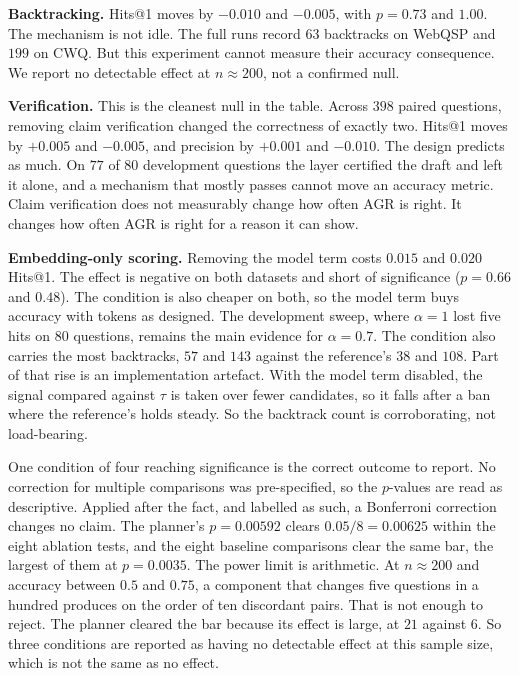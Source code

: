 \textbf{Backtracking.} Hits@1 moves by $-0.010$ and $-0.005$, with $p = 0.73$
and $1.00$. The mechanism is not idle. The full runs record $63$ backtracks on
WebQSP and $199$ on CWQ. But this experiment cannot measure their accuracy
consequence. We report no detectable effect at $n \approx 200$, not a confirmed
null.

\textbf{Verification.} This is the cleanest null in the table. Across $398$
paired questions, removing claim verification changed the correctness of exactly
two. Hits@1 moves by $+0.005$ and $-0.005$, and precision by $+0.001$ and
$-0.010$. The design predicts as much. On $77$ of $80$ development questions the
layer certified the draft and left it alone, and a mechanism that mostly passes
cannot move an accuracy metric. Claim verification does not measurably change
how often AGR is right. It changes how often AGR is right for a reason it can
show.

\textbf{Embedding-only scoring.} Removing the model term costs $0.015$ and
$0.020$ Hits@1. The effect is negative on both datasets and short of
significance ($p = 0.66$ and $0.48$). The condition is also cheaper on both, so
the model term buys accuracy with tokens as designed. The development sweep,
where $\alpha = 1$ lost five hits on $80$ questions, remains the main evidence
for $\alpha = 0.7$. The condition also carries the most backtracks, $57$ and
$143$ against the reference's $38$ and $108$. Part of that rise is an
implementation artefact. With the model term disabled, the signal compared
against $\tau$ is taken over fewer candidates, so it falls after a ban where the
reference's holds steady. So the backtrack count is corroborating, not
load-bearing.

One condition of four reaching significance is the correct outcome to report. No
correction for multiple comparisons was pre-specified, so the $p$-values are
read as descriptive. Applied after the fact, and labelled as such, a Bonferroni
correction changes no claim. The planner's $p = 0.00592$ clears $0.05/8 =
0.00625$ within the eight ablation tests, and the eight baseline comparisons
clear the same bar, the largest of them at $p = 0.0035$. The power limit is
arithmetic. At $n \approx 200$ and accuracy between $0.5$ and $0.75$, a
component that changes five questions in a hundred produces on the order of ten
discordant pairs. That is not enough to reject. The planner cleared the bar
because its effect is large, at $21$ against $6$. So three conditions are
reported as having no detectable effect at this sample size, which is not the
same as no effect.

\endinput
